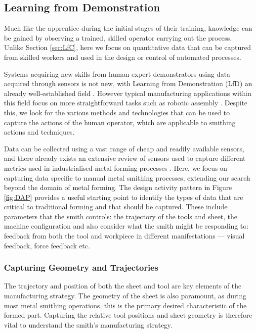 \subsection{Learning from Demonstration} \label{sec:LfD} 
Much like the apprentice during the initial stages of their training, knowledge can be gained by observing a trained, skilled operator carrying out the process. Unlike Section \ref{sec:LfC}, here we focus on quantitative data that can be captured from skilled workers and used in the design or control of automated processes.

Systems acquiring new skills from human expert demonstrators using data acquired through sensors is not new, with Learning from Demonstration (LfD)  an already well-established field \citep{Ravichandar2020RecentDemonstration}. 
However typical manufacturing applications within this field focus on more straightforward tasks such as robotic assembly \citep{Zhu2018RobotSurvey}. Despite this, we look for the various methods and technologies that can be used to capture the actions of the human operator, which are applicable to smithing actions and techniques.

Data can be collected using a vast range of cheap and readily available sensors, and there already exists an extensive review of sensors used to capture different metrics used in industrialised metal forming processes \citep{Allwood2016Closed-loopForming}. Here, we focus on capturing data specific to manual metal smithing processes, extending our search beyond the domain of metal forming. The design activity pattern in Figure \ref{fig:DAP} provides a useful starting point to identify the types of data that are critical to traditional forming and that should be captured. These include parameters that the smith controls: the trajectory of the tools and sheet, the machine configuration and also consider what the smith might be responding to: feedback from both the tool and workpiece in different manifestations --- visual feedback, force feedback etc. 

\subsubsection{Capturing Geometry and Trajectories}
The trajectory and position of both the sheet and tool are key elements of the manufacturing strategy. The geometry of the sheet is also paramount, as during most metal smithing operations, this is the primary desired characteristic of the formed part. Capturing the relative tool positions and sheet geometry is therefore vital to understand the smith’s manufacturing strategy.


